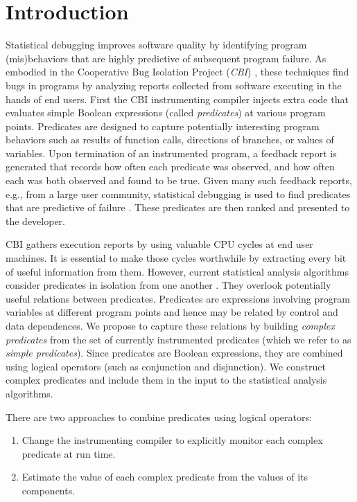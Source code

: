 
\section{Introduction}

Statistical debugging improves software quality by identifying program (mis)behaviors that are highly predictive of subsequent program failure.  As embodied in the Cooperative Bug Isolation Project (\emph{CBI}) \cite{Liblit:2004:CBI}, these techniques find bugs in programs by analyzing reports collected from software executing in the hands of end users.  First the CBI instrumenting compiler injects extra code that evaluates simple Boolean expressions (called \emph{predicates}) at various program points.  Predicates are designed to capture potentially interesting program behaviors such as results of function calls, directions of branches, or values of variables.  Upon termination of an instrumented program, a feedback report is generated that records how often each predicate was observed, and how often each was both observed and found to be true.  Given many such feedback reports, e.g., from a large user community, statistical debugging is used to find predicates that are predictive of failure \cite{Liblit:2005:SSBI,Zheng:2006:SDSIMB}.  These predicates are then ranked and presented to the developer.

CBI gathers execution reports by using valuable CPU cycles at end user machines.  It is essential to make those cycles worthwhile by extracting every bit of useful information from them.  However, current statistical analysis algorithms consider predicates in isolation from one another \cite{Liblit:2005:SSBI,Zheng:2006:SDSIMB}.  They overlook potentially useful relations between predicates.  Predicates are expressions involving program variables at different program points and hence may be related by control and data dependences.  We propose to capture these relations by building \emph{complex predicates} from the set of currently instrumented predicates (which we refer to as \emph{simple predicates}).  Since predicates are Boolean expressions, they are combined using logical operators (such as conjunction and disjunction).  We construct complex predicates and include them in the input to the statistical analysis algorithms.

There are two approaches to combine predicates using logical operators:
\begin{enumerate}
\item Change the instrumenting compiler to explicitly monitor each complex predicate at run time.
\item Estimate the value of each complex predicate from the values of its components.
\end{enumerate}

